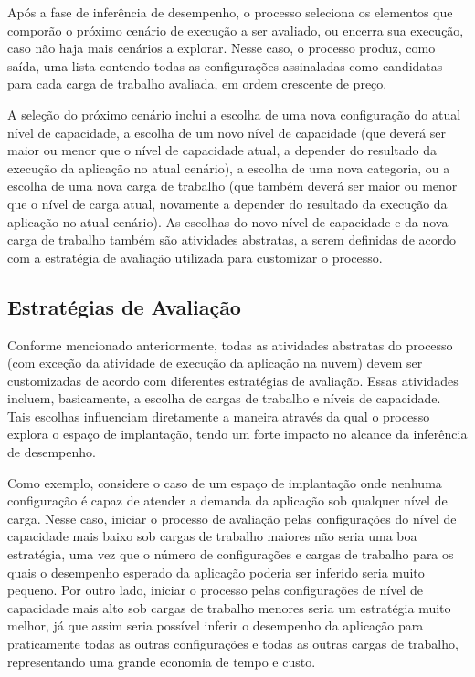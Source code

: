 \documentclass[12pt]{article}
\begin{document}
Após a fase de inferência de desempenho, o processo seleciona os elementos que comporão o próximo cenário de execução a ser avaliado, ou encerra sua execução, caso não haja mais cenários a explorar. Nesse caso, o processo produz, como saída, uma lista contendo todas as configurações assinaladas como candidatas para cada carga de trabalho avaliada, em ordem crescente de preço.

A seleção do próximo cenário inclui a escolha de uma nova configuração do atual nível de capacidade, a escolha de um novo nível de capacidade (que deverá ser maior ou menor que o nível de capacidade atual, a depender do resultado da execução da aplicação no atual cenário), a escolha de uma nova categoria, ou a escolha de uma nova carga de trabalho (que também deverá ser maior ou menor que o nível de carga atual, novamente a depender do resultado da execução da aplicação no atual cenário). As escolhas do novo nível de capacidade e da nova carga de trabalho também são atividades abstratas, a serem definidas de acordo com a estratégia de avaliação utilizada para customizar o processo. 


\subsection{Estratégias de Avaliação}\label{sec:strategies}

Conforme mencionado anteriormente, todas as atividades abstratas do processo (com exceção da atividade de execução da aplicação na nuvem) devem ser customizadas de acordo com diferentes estratégias de avaliação. Essas atividades incluem, basicamente, a escolha de cargas de trabalho e níveis de capacidade. Tais escolhas influenciam diretamente a maneira através da qual o processo explora o espaço de implantação, tendo um forte impacto no alcance da inferência de desempenho. 

Como exemplo, considere o caso de um espaço de implantação onde nenhuma configuração é capaz de atender a 
demanda da aplicação sob qualquer nível de carga. Nesse caso, iniciar o processo de avaliação pelas 
configurações do nível de capacidade mais baixo sob cargas de trabalho maiores não seria uma boa estratégia, 
uma vez que o número de configurações e cargas de trabalho para os quais o desempenho esperado da 
aplicação poderia ser inferido seria muito pequeno. Por outro lado, iniciar o processo pelas configurações de nível 
de capacidade mais alto sob cargas de trabalho menores seria um estratégia muito melhor, já que assim seria possível 
inferir o desempenho da aplicação para praticamente todas as outras
configurações e todas as outras cargas de trabalho, representando uma grande economia de tempo e custo.
\end{document}

